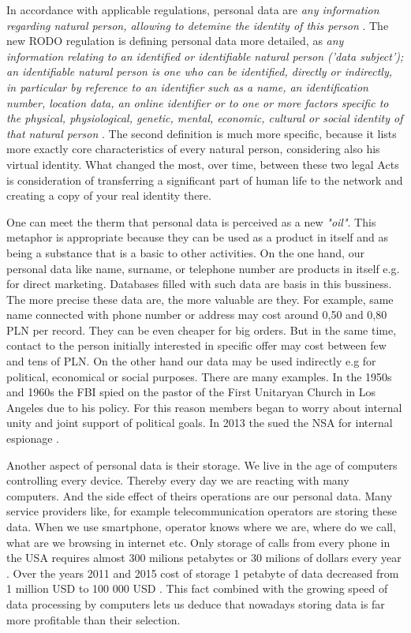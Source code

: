 \documentclass[en, noamssymb]{mgr}
\begin{document}
In accordance with applicable regulations, personal data are \textit{any information regarding natural person, allowing to detemine the identity of this person} \cite{uodo_art6}. The new RODO regulation is defining personal data more detailed, as \textit{any information relating to an identified or identifiable natural person ('data subject'); an identifiable natural person is one who can be identified, directly or indirectly, in particular by reference to an identifier such as a name, an identification number, location data, an online identifier or to one or more factors specific to the physical, physiological, genetic, mental, economic, cultural or social identity of that natural person} \cite{rodo_art4}. The second definition is much more specific, because it lists more exactly core characteristics of every natural person, considering also his virtual identity. What changed the most, over time, between these two legal Acts is consideration of transferring a significant part of human life to the network and creating a copy of your real identity there.

\indent One can meet the therm that personal data is perceived as a new \textit{"oil"}. This metaphor is appropriate because they can be used as a product in itself and as being a substance that is a basic to other activities. On the one hand, our personal data like name, surname, or telephone number are products in itself e.g. for direct marketing. Databases filled with such data are basis in this bussiness. The more precise these data are, the more valuable are they. For example, same name connected with phone number or address may cost around 0,50 and 0,80 PLN per record. They can be even cheaper for big orders. But in the same time, contact to the person initially interested in specific offer may cost between few and tens of PLN. On the other hand our data may be used indirectly e.g for political, economical or social purposes. There are many examples. In the 1950s and 1960s the FBI spied on the pastor of the First Unitaryan Church in Los Angeles due to his policy. For this reason members began to worry about internal unity and joint support of political goals. In 2013 the sued the NSA for internal espionage \cite{dane_i_goliat}.

\indent Another aspect of personal data is their storage. We live in the age of computers controlling every device. Thereby every day we are reacting with many computers. And the side effect of theirs operations are our personal data. Many service providers like, for example telecommunication operators are storing these data. When we use smartphone, operator knows where we are, where do we call, what are we browsing in internet etc. Only storage of calls from every phone in the USA requires almost 300 milions petabytes or 30 milions of dollars every year \cite{dane_i_goliat}. Over the years 2011 and 2015 cost of storage 1 petabyte of data decreased from 1 million USD to 100 000 USD \cite{dane_i_goliat}. This fact combined with the growing speed of data processing by computers lets us deduce that nowadays storing data is far more profitable than their selection.
\end{document}
